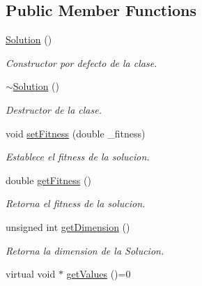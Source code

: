 \subsection*{Public Member Functions}
\begin{DoxyCompactItemize}
\item 
\hypertarget{class_solution_ab55bd4b023d596ce11aaf737b9a6123b}{\hyperlink{class_solution_ab55bd4b023d596ce11aaf737b9a6123b}{Solution} ()}\label{class_solution_ab55bd4b023d596ce11aaf737b9a6123b}

\begin{DoxyCompactList}\small\item\em Constructor por defecto de la clase. \end{DoxyCompactList}\item 
\hypertarget{class_solution_a5d245f7409aacf6ace5e965b7879a580}{\hyperlink{class_solution_a5d245f7409aacf6ace5e965b7879a580}{$\sim$\+Solution} ()}\label{class_solution_a5d245f7409aacf6ace5e965b7879a580}

\begin{DoxyCompactList}\small\item\em Destructor de la clase. \end{DoxyCompactList}\item 
void \hyperlink{class_solution_a14efa947803fd35d6af01aaf83eed17b}{set\+Fitness} (double \+\_\+fitness)
\begin{DoxyCompactList}\small\item\em Establece el fitness de la solucion. \end{DoxyCompactList}\item 
double \hyperlink{class_solution_a794776f952a06bb4a4a7e0f198efcfa2}{get\+Fitness} ()
\begin{DoxyCompactList}\small\item\em Retorna el fitness de la solucion. \end{DoxyCompactList}\item 
unsigned int \hyperlink{class_solution_aeb1c4eb1bd5aca251f43c92720c36d25}{get\+Dimension} ()
\begin{DoxyCompactList}\small\item\em Retorna la dimension de la Solucion. \end{DoxyCompactList}\item 
\hypertarget{class_solution_a856741c28b047bae68aa7cb3721d30bb}{virtual void $\ast$ \hyperlink{class_solution_a856741c28b047bae68aa7cb3721d30bb}{get\+Values} ()=0}\label{class_solution_a856741c28b047bae68aa7cb3721d30bb}


\end{DoxyCompactItemize}
